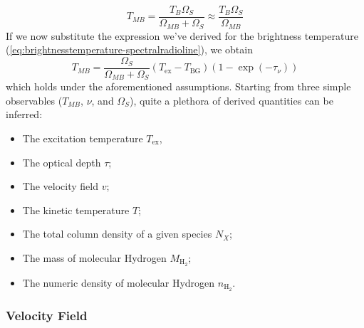 \begin{equation}
    T_{MB} = \frac{T_{B}\Omega_{S}}{\Omega_{MB}+\Omega_{S}} \approx \frac{T_{B}\Omega_{S}}{\Omega_{MB}}
\end{equation}
If we now substitute the expression we've derived for the brightness temperature (\ref{eq:brightnesstemperature-spectralradioline}), we obtain 
\begin{equation}
    T_{MB} = \frac{\Omega_{S}}{\Omega_{MB}+\Omega_{S}}(T_{\text{ex}}-T_{\text{BG}})(1-\exp(-\tau_{\nu}))
\end{equation}
which holds under the aforementioned assumptions. Starting from three simple observables ($T_{MB}$, $\nu$, and $\Omega_{S}$), quite a plethora of derived quantities can be inferred:
\begin{itemize}
    \item The excitation temperature $T_{\text{ex}}$,
    \item The optical depth $\tau$;
    \item The velocity field $v$;
    \item The kinetic temperature $T$;
    \item The total column density of a given species $N_{X}$;
    \item The mass of molecular Hydrogen $M_{\text{H}_{2}}$;
    \item The numeric density of molecular Hydrogen $n_{\text{H}_{2}}$.
\end{itemize}

\subsubsection{Velocity Field}

